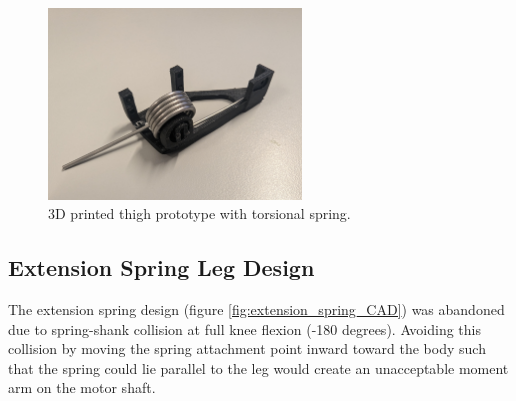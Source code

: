 \begin{figure}[h!]
    \centering
    \includegraphics[width=0.6\textwidth]{Images/printed_leg_and_spring.jpg}
    \caption{3D printed thigh prototype with torsional spring.}
    \label{fig:printed_leg_and_spring}
\end{figure}

\subsection{Extension Spring Leg Design}
\label{sec:extension_spring_design}

The extension spring design (figure \ref{fig:extension_spring_CAD}) was abandoned due to spring-shank collision at full knee flexion (-180 degrees). Avoiding this collision by moving the spring attachment point inward toward the body such that the spring could lie parallel to the leg would create an unacceptable moment arm on the motor shaft.

